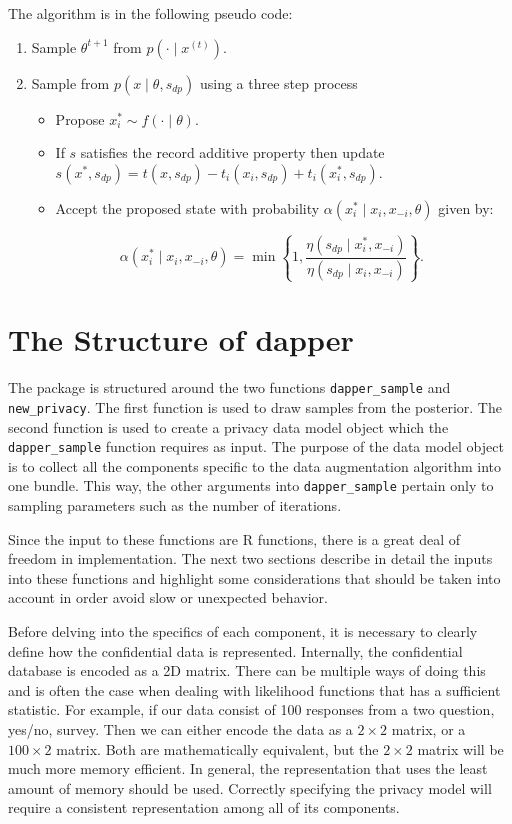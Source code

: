 The algorithm is in the following pseudo code:

\begin{enumerate}
\def\labelenumi{\arabic{enumi}.}
\tightlist
\item
  Sample \(\theta^{t+1}\) from \(p(\cdot \mid x^{(t)})\).
\item
  Sample from \(p(x \mid \theta, s_{dp})\) using a three step process

  \begin{itemize}
  \tightlist
  \item
    Propose \(x_{i}^{*} \sim f(\cdot \mid \theta)\).
  \item
    If \(s\) satisfies the record additive property then
    update \(s(x^*, s_{dp}) = t(x,s_{dp}) - t_i(x_i,s_{dp}) + t_{i}(x_i^*, s_{dp})\).
  \item
    Accept the proposed state with probability \(\alpha(x_i^* \mid x_i, x_{-i}, \theta)\)
    given by:
  \end{itemize}

  \[
     \alpha(x_i^* \mid x_i, x_{-i}, \theta) = \min \left\{ 1, \dfrac{\eta(s_{dp} \mid x_i^*, x_{-i})}{\eta(s_{dp} \mid x_i, x_{-i})} \right\}.
   \]
\end{enumerate}

\hypertarget{the-structure-of-dapper}{%
\section{The Structure of dapper}\label{the-structure-of-dapper}}

The package is structured around the two functions \texttt{dapper\_sample} and
\texttt{new\_privacy}. The first function is used to draw samples from the
posterior. The second function is used to create a privacy data model object
which the \texttt{dapper\_sample} function requires as input. The purpose of the data model
object is to collect all the components specific to the data augmentation algorithm
into one bundle. This way, the other arguments into \texttt{dapper\_sample} pertain only
to sampling parameters such as the number of iterations.

Since the input to these functions are R functions, there is a great deal of freedom
in implementation. The next two sections describe in detail the inputs into
these functions and highlight some considerations that should be taken
into account in order avoid slow or unexpected behavior.

Before delving into the specifics of each component, it is necessary to clearly
define how the confidential data is represented. Internally, the
confidential database is encoded as a 2D matrix. There can be multiple ways
of doing this and is often the case when dealing with likelihood functions
that has a sufficient statistic. For example, if our data consist
of 100 responses from a two question, yes/no, survey. Then we can either encode
the data as a \(2 \times 2\) matrix, or a \(100 \times 2\) matrix. Both are mathematically
equivalent, but the \(2 \times 2\) matrix will be much more memory efficient.
In general, the representation that uses the least amount of memory should be
used. Correctly specifying the privacy model will require a consistent
representation among all of its components.

